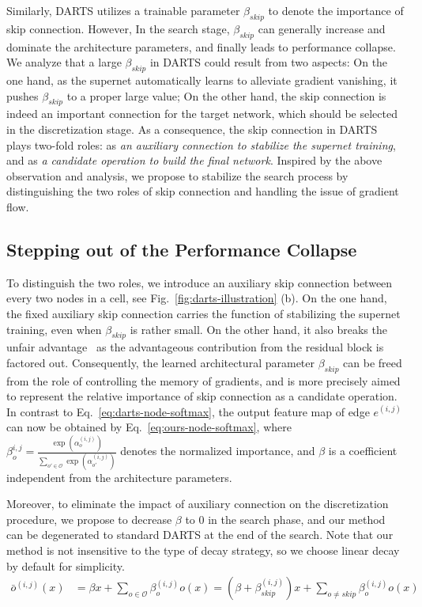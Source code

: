 \documentclass{article} \usepackage{iclr2021_conference,times}
\begin{document}
Similarly, DARTS \citep{liu2018darts} utilizes a trainable parameter $\beta_{skip}$ to denote the importance of skip connection.
However, In the search stage, $\beta_{skip}$ can generally increase and dominate the architecture parameters, and finally leads to performance collapse.
We analyze that a large $\beta_{skip}$ in DARTS could result from two aspects: On the one hand, as the supernet automatically learns to alleviate gradient vanishing, it pushes $\beta_{skip}$ to a proper large value; On the other hand, the skip connection is indeed an important connection for the target network, which should be selected in the discretization stage. As a consequence, the skip connection in DARTS plays two-fold roles: as \emph{an auxiliary connection to stabilize the supernet training}, and as \emph{a candidate operation to build the final network}. 
Inspired by the above observation and analysis, we propose to stabilize the search process by distinguishing the two roles of skip connection and handling the issue of gradient flow.


\subsection{Stepping out of the Performance Collapse}

To distinguish the two roles, we introduce an auxiliary skip connection between every two nodes in a cell, see Fig.~\ref{fig:darts-illustration} (b). 
On the one hand, the fixed auxiliary skip connection carries the function of stabilizing the supernet training, even when $\beta_{skip}$ is rather small. On the other hand, it also breaks the unfair advantage~\citep{chu2019fair} as the advantageous contribution from the residual block is factored out. 
Consequently, the learned architectural parameter $\beta_{skip}$ can be freed from the role of controlling the memory of gradients, and is more precisely aimed to represent the relative importance of skip connection as a candidate operation. In contrast to Eq.~\ref{eq:darts-node-softmax}, the output feature map of edge $e^{(i,j)}$ can now be obtained by Eq.~\ref{eq:ours-node-softmax}, where $\beta_o^{i,j} = \frac{\exp(\alpha_{o}^{(i,j)})}{\sum_{o' \in \mathcal{O}} \exp(\alpha_{o'}^{(i,j)})}$ denotes the normalized importance, and $\beta$ is a coefficient independent from the architecture parameters.

Moreover, to eliminate the impact of auxiliary connection on the discretization procedure, we propose to decrease $\beta$ to 0 in the search phase, and our method can be degenerated to standard DARTS at the end of the search.  Note that our method is not insensitive to the type of decay strategy, so we choose linear decay by default  for simplicity.
\begin{align}\label{eq:ours-node-softmax}
\bar{o}^{(i,j)}(x) &= \beta x + \sum_{o \in \mathcal{O}}\beta^{(i,j)}_o o(x) = \left(\beta+\beta^{(i,j)}_{skip}\right)x + \sum_{o \neq skip}\beta^{(i,j)}_o o(x) 
\end{align}
\end{document}
